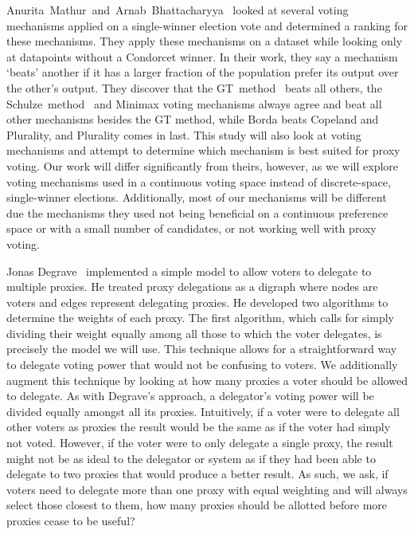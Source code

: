 Anurita~Mathur~and~Arnab~Bhattacharyya~\cite{Mathur2017} looked at several voting
mechanisms applied on a single-winner election vote and determined a ranking for
these mechanisms.
They apply these mechanisms on a dataset while looking only at datapoints without a
Condorcet winner.
In their work, they say a mechanism `beats' another if it has a larger fraction of
the population prefer its output over the other's output.
They discover that the GT~method~\cite{Rivest2010} beats all others,
the Schulze~method~\cite{Schulze2011} and Minimax voting mechanisms always agree and
beat all other mechanisms besides the GT method, while Borda beats Copeland and
Plurality, and Plurality comes in last.
This study will also look at voting mechanisms and attempt to determine which
mechanism is best suited for proxy voting.
Our work will differ significantly from theirs, however, as we will explore voting
mechanisms used in a continuous voting space instead of discrete-space, single-winner
elections.
Additionally, most of our mechanisms will be different due the mechanisms they used
not being beneficial on a continuous preference space or with a small number of
candidates, or not working well with proxy voting.

Jonas Degrave~\cite{Degrave2014} implemented a simple model to allow voters to
delegate to multiple proxies.
He treated proxy delegations as a digraph where nodes are voters and edges represent
delegating proxies.
He developed two algorithms to determine the weights of each proxy.
The first algorithm, which calls for simply dividing their weight equally among all
those to which the voter delegates, is precisely the model we will use.
This technique allows for a straightforward way to delegate voting power that would
not be confusing to voters.
We additionally augment this technique by looking at how many proxies a voter should be
allowed to delegate.
As with Degrave's approach, a delegator's voting power will be divided equally amongst
all its proxies.
Intuitively, if a voter were to delegate all other voters as proxies the result would
be the same as if the voter had simply not voted.
However, if the voter were to only delegate a single proxy, the result might not be
as ideal to the delegator or system as if they had been able to delegate to two proxies
that would produce a better result.
As such, we ask, if voters need to delegate more than one proxy with equal weighting and
will always select those closest to them, how many proxies should be allotted before
more proxies cease to be useful?

